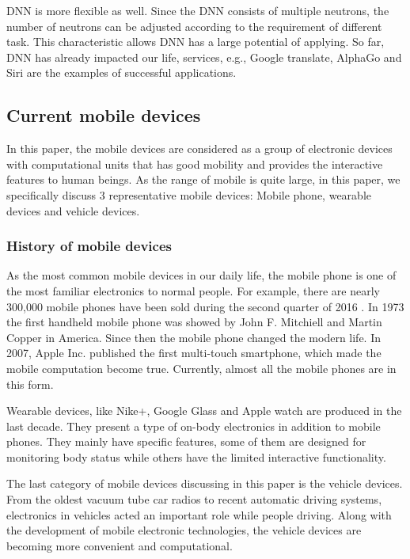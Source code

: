 \documentclass[article]{aaltoseries}
\begin{document}
DNN is more flexible as well. Since the DNN consists of multiple neutrons, the number of neutrons can be adjusted
according to the requirement of different task. This characteristic allows DNN has a large potential of applying. So far, 
DNN has already impacted our life, services, e.g., Google translate, AlphaGo and Siri are the examples of successful applications.








\subsection{Current mobile devices} %

In this paper, the mobile devices are considered as a group of electronic devices with
computational units that has good mobility and provides the interactive features to human beings.
As the range of mobile is quite large, in this paper, we specifically discuss 3 representative 
mobile devices: Mobile phone, wearable devices and vehicle devices.




\subsubsection{History of mobile devices}

As the most common mobile devices in our daily life, the mobile phone is one of the most familiar 
electronics to normal people. For example, there are nearly 300,000 mobile phones have been 
sold during the second quarter of 2016 \cite{moblePhoneSale}. In 1973 the first handheld mobile phone
was showed by John F. Mitchiell and Martin Copper in America. Since then the mobile phone 
changed the modern life. In 2007, Apple Inc. published the first multi-touch smartphone,
 which made the mobile computation become true.
  Currently, almost all the mobile phones are in this form. 


Wearable devices, like Nike+, Google Glass and Apple watch are produced in the last decade. They present
a type of on-body electronics in addition to mobile phones. They mainly have specific features, some of them
are designed for monitoring body status while others have the limited interactive functionality.

The last category of mobile devices discussing in this paper is the vehicle devices. From the oldest vacuum tube
car radios to recent automatic driving systems, electronics in vehicles acted an important role while people
driving. Along with the development of mobile electronic technologies, the vehicle devices are becoming more convenient
and computational.
\end{document}
